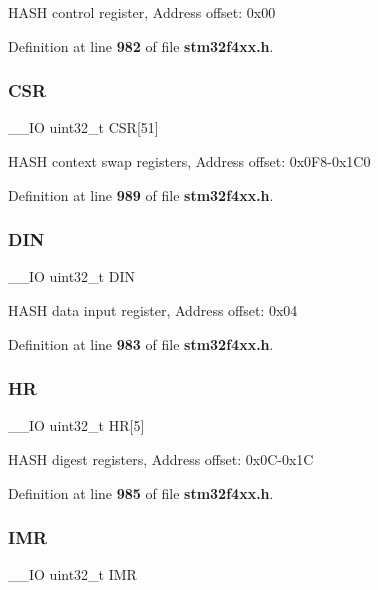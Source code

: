 H\+A\+SH control register, Address offset\+: 0x00 

Definition at line \textbf{ 982} of file \textbf{ stm32f4xx.\+h}.

\mbox{\label{structHASH__TypeDef_a5a72a62805d5497f2b44448edd18f20f}} 
\subsubsection{C\+SR}
{\footnotesize\ttfamily \+\_\+\+\_\+\+IO uint32\+\_\+t C\+SR[51]}

H\+A\+SH context swap registers, Address offset\+: 0x0\+F8-\/0x1\+C0 

Definition at line \textbf{ 989} of file \textbf{ stm32f4xx.\+h}.

\mbox{\label{structHASH__TypeDef_a445dd5529e7dc6a4fa2fec4f78da2692}} 
\subsubsection{D\+IN}
{\footnotesize\ttfamily \+\_\+\+\_\+\+IO uint32\+\_\+t D\+IN}

H\+A\+SH data input register, Address offset\+: 0x04 

Definition at line \textbf{ 983} of file \textbf{ stm32f4xx.\+h}.

\mbox{\label{structHASH__TypeDef_a02cdb629fbb2bfa63db818ac846847a1}} 
\subsubsection{HR}
{\footnotesize\ttfamily \+\_\+\+\_\+\+IO uint32\+\_\+t HR[5]}

H\+A\+SH digest registers, Address offset\+: 0x0\+C-\/0x1C 

Definition at line \textbf{ 985} of file \textbf{ stm32f4xx.\+h}.

\mbox{\label{structHASH__TypeDef_ae845b86e973b4bf8a33c447c261633f6}} 
\subsubsection{I\+MR}
{\footnotesize\ttfamily \+\_\+\+\_\+\+IO uint32\+\_\+t I\+MR}

